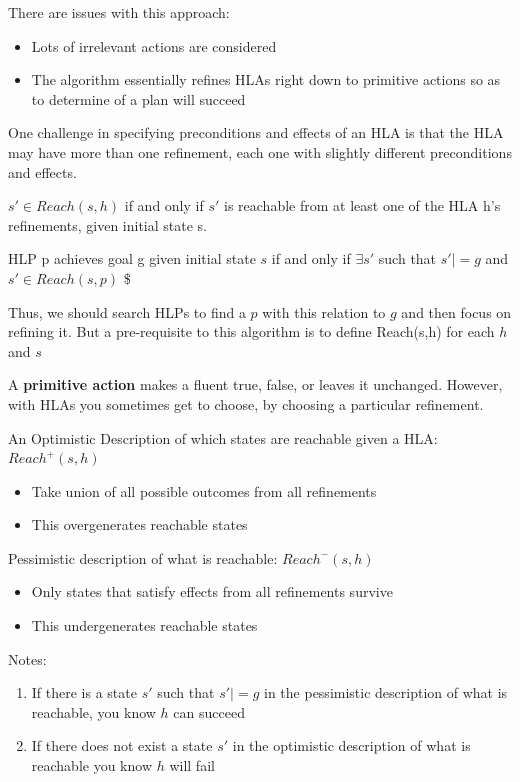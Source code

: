 \documentclass{article}
\begin{document}
There are issues with this approach:
\begin{itemize}
    \item Lots of irrelevant actions are considered
    \item The algorithm essentially refines HLAs right down to primitive actions so as to determine of a plan will succeed
\end{itemize}

One challenge in specifying preconditions and effects of an HLA is that the HLA may have more than one refinement, each one with slightly different preconditions and effects. 

$s' \in Reach(s,h)$ if and only if $s'$ is reachable from at least one of the HLA h's refinements, given initial state s. 

HLP p achieves goal g given initial state $s$ if and only if $\exists s'$ such that $s' |= g$ and $s' \in Reach (s, p)$ \$

Thus, we should search HLPs to find a $p$ with this relation to $g$ and then focus on refining it. But a pre-requisite to this algorithm is to define Reach(s,h) for each $h$ and $s$

A \textbf{primitive action} makes a fluent true, false, or leaves it unchanged. However, with HLAs you sometimes get to choose, by choosing a particular refinement. \newline

An Optimistic Description of which states are reachable given a HLA: $Reach^+(s,h)$
\begin{itemize}
    \item Take union of all possible outcomes from all refinements
    \item This overgenerates reachable states
\end{itemize}

Pessimistic description of what is reachable: $Reach^-(s,h)$
\begin{itemize}
    \item Only states that satisfy effects from all refinements survive
    \item This undergenerates reachable states
\end{itemize}

Notes:
\begin{enumerate}

    \item If there is a state $s'$ such that $s' |= g$ in the pessimistic description of what is reachable, you know $h$ can succeed 
    \item If there does not exist a state $s'$ in the optimistic description of what is reachable you know $h$ will fail

    
\end{enumerate}
\end{document}
